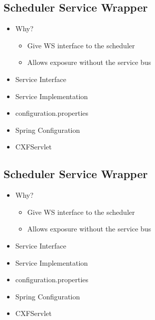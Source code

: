 \documentclass[12pt,notitlepage]{article}
\begin{document}
\begin{s5presentation}
\begin{s5slide}
  \W \end{s5slide}

%
%
  \W \begin{s5slide}
    \section{Scheduler Service Wrapper }
    \begin{itemize}
      \item Why? 
        \begin{itemize}
          \item Give WS interface to the scheduler
          \item Allows exposure without the service bus
        \end{itemize}
      \item Service Interface
      \item Service Implementation
      \item configuration.properties
      \item Spring Configuration
      \item CXFServlet
    \end{itemize}
    
  \W \end{s5slide}

%
%
  \W \begin{s5slide}
    \section{Scheduler Service Wrapper }
    \begin{itemize}
      \item Why? 
        \begin{itemize}
          \item Give WS interface to the scheduler
          \item Allows exposure without the service bus
        \end{itemize}
      \item Service Interface
      \item Service Implementation
      \item configuration.properties
      \item Spring Configuration
      \item CXFServlet
    \end{itemize}
    

\end{s5slide}
\end{s5presentation}
\end{document}
